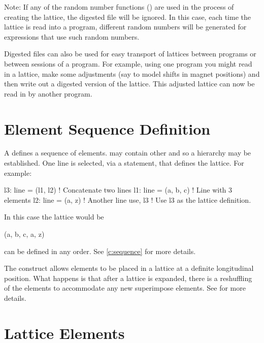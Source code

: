 Note: If any of the random number functions () are
used in the process of creating the lattice, the digested file will be
ignored. In this case, each time the lattice is read into a program,
different random numbers will be generated for expressions that use such
random numbers.

Digested files can also be used for easy transport of lattices between
programs or between sessions of a program. For example, using one
program you might read in a lattice, make some adjustments (say to model
shifts in magnet positions) and then write out a digested version of the
lattice. This adjusted lattice can now be read in by another program.

\section{Element Sequence Definition}

A  defines a sequence of elements.  may contain
other  and so a hierarchy may be established. One line is
selected, via a  statement, that defines the lattice. For
example:
\begin{example}
  l3: line = (l1, l2)   ! Concatenate two lines
  l1: line = (a, b, c)  ! Line with 3 elements
  l2: line = (a, z)     ! Another line 
  use, l3               ! Use l3 as the lattice definition.
\end{example}
In this case the lattice would be
\begin{example}
  (a, b, c, a, z)
\end{example}
 can be defined in any order. See \cref{c:sequence} for more
details.

The  construct allows elements to be placed in a
lattice at a definite longitudinal position. What happens is that
after a lattice is expanded, there is a reshuffling of the elements to
accommodate any new superimpose elements. See  for more
details.

\section{Lattice Elements}

